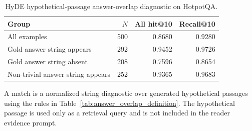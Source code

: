 \begin{table}[t]
\centering
\caption{HyDE hypothetical-passage answer-overlap diagnostic on HotpotQA.}
\label{tab:hyde_overlap_diagnostic}
\scriptsize
\begin{threeparttable}
\setlength{\tabcolsep}{3pt}
\begin{tabularx}{\columnwidth}{>{\raggedright\arraybackslash}X r r r}
\toprule
Group & $N$ & All hit@10 & Recall@10 \\
\midrule
All examples & 500 & 0.8680 & 0.9280 \\
Gold answer string appears & 292 & 0.9452 & 0.9726 \\
Gold answer string absent & 208 & 0.7596 & 0.8654 \\
Non-trivial answer string appears & 252 & 0.9365 & 0.9683 \\
\bottomrule
\end{tabularx}
\begin{tablenotes}
\footnotesize
\item A match is a normalized string diagnostic over generated hypothetical passages using the rules in Table~\ref{tab:answer_overlap_definition}. The hypothetical passage is used only as a retrieval query and is not included in the reader evidence prompt.
\end{tablenotes}
\end{threeparttable}
\end{table}
